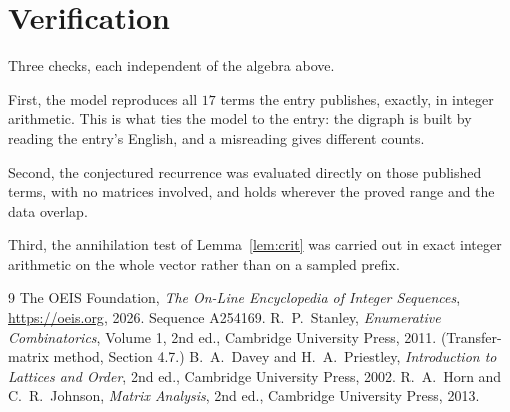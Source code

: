 \documentclass[11pt,a4paper]{article}
\theoremstyle{plain}
\theoremstyle{definition}
\begin{document}
\section{Verification}

Three checks, each independent of the algebra above.

First, the model reproduces all $17$ terms the entry publishes, exactly, in integer
arithmetic. This is what ties the model to the entry: the digraph is built by reading the
entry's English, and a misreading gives different counts.

Second, the conjectured recurrence was evaluated directly on those published terms, with no
matrices involved, and holds wherever the proved range and the data overlap.

Third, the annihilation test of Lemma~\ref{lem:crit} was carried out in exact integer
arithmetic on the whole vector rather than on a sampled prefix.

\begin{thebibliography}{9}
 The OEIS Foundation, \emph{The On-Line Encyclopedia of Integer
Sequences}, \url{https://oeis.org}, 2026. Sequence A254169.
 R.~P.~Stanley, \emph{Enumerative Combinatorics}, Volume 1, 2nd ed.,
Cambridge University Press, 2011. (Transfer-matrix method, Section 4.7.)
 B.~A.~Davey and H.~A.~Priestley, \emph{Introduction to Lattices and
Order}, 2nd ed., Cambridge University Press, 2002.
 R.~A.~Horn and C.~R.~Johnson, \emph{Matrix Analysis}, 2nd ed., Cambridge
University Press, 2013.
\end{thebibliography}
\end{document}
